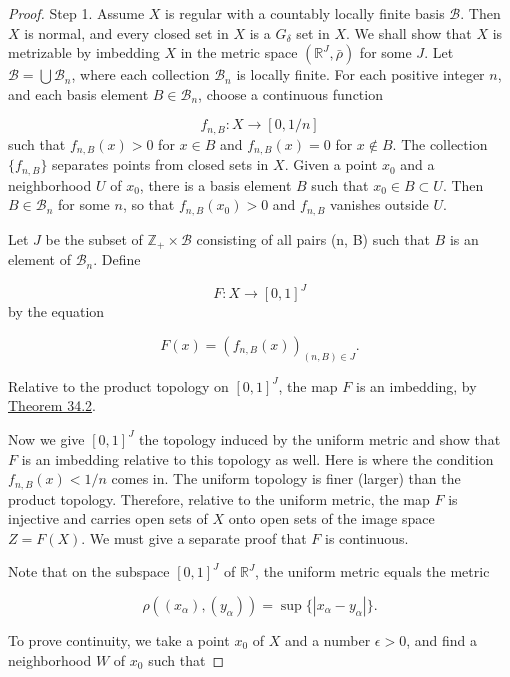 \begin{proof}
 Step 1. Assume \(X\) is regular with a countably locally finite basis \(\mathcal{B}\). Then \(X\) is normal, and every closed set in \(X\) is a \(G_{\delta }\) set in \(X\). We shall show that \(X\) is metrizable by imbedding \(X\) in the metric space \(({\mathbb{R}^{J},\bar{\rho }})\) for some \(J\).
Let \(\mathcal{B} = \bigcup {\mathcal{B}}_{n}\), where each collection \(\mathcal{B}_{n}\) is locally finite. For each positive integer \(n\), and each basis element \(B \in {\mathcal{B}}_{n}\), choose a continuous function

\[
f_{n,B} : X \rightarrow [{0,1/n}]
\]
such that \(f_{n,B}(x) > 0\) for \(x \in B\) and \(f_{n,B}(x) = 0\) for \(x \notin B\). The collection \(\{ f_{n,B}\}\) separates points from closed sets in \(X\). Given a point \(x_{0}\) and a neighborhood \(U\) of \(x_{0}\), there is a basis element \(B\) such that \(x_{0} \in B \subset U\). Then \(B \in {\mathcal{B}}_{n}\) for some \(n\), so that \(f_{n,B}(x_{0}) > 0\) and \(f_{n,B}\) vanishes outside \(U\).

Let \(J\) be the subset of \(\mathbb{Z}_{ + } \times \mathcal{B}\) consisting of all pairs (n, B) such that \(B\) is an element of \(\mathcal{B}_{n}\). Define

\[
F : X \rightarrow {[ 0,1] }^{J}
\]
by the equation

\[
F(x) = ({f_{n,B}(x) })_{(n, B) \in J}.
\]

Relative to the product topology on \({[ 0,1] }^{J}\), the map \(F\) is an imbedding, by \hyperref[thm:34.2]{Theorem 34.2}.

Now we give \({[ 0,1] }^{J}\) the topology induced by the uniform metric and show that \(F\) is an imbedding relative to this topology as well. Here is where the condition \(f_{n,B}(x) < 1/n\) comes in. The uniform topology is finer (larger) than the product topology. Therefore, relative to the uniform metric, the map \(F\) is injective and carries open sets of \(X\) onto open sets of the image space \(Z = F(X)\). We must give a separate proof that \(F\) is continuous.

Note that on the subspace \({[ 0,1] }^{J}\) of \(\mathbb{R}^{J}\), the uniform metric equals the metric

\[
\rho ({(x_{\alpha }),(y_{\alpha }) }) = \sup \{ | {x_{\alpha } - y_{\alpha }}| \}.
\]

To prove continuity, we take a point \(x_{0}\) of \(X\) and a number \(\epsilon > 0\), and find a neighborhood \(W\) of \(x_{0}\) such that


\end{proof}

